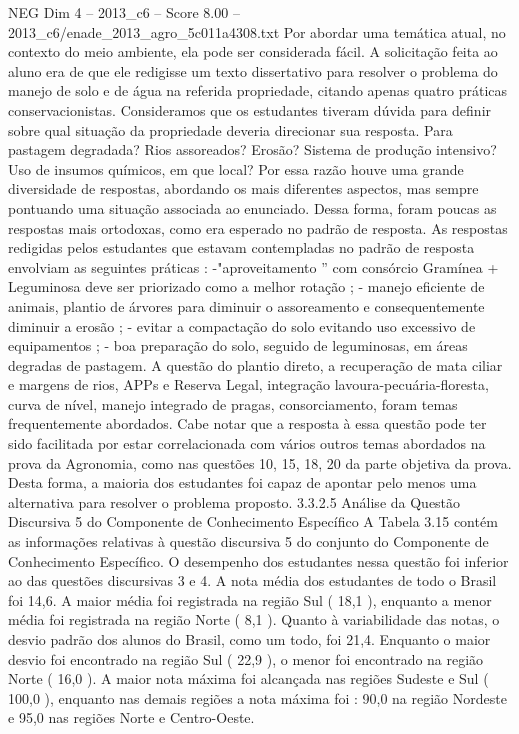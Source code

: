 \begin{textsample}{NEG Dim 4 – 2013\_c6 – Score 8.00 – 2013\_c6/enade\_2013\_agro\_5c011a4308.txt}
Por abordar uma temática atual, no contexto do meio ambiente, ela pode ser considerada fácil.
A solicitação feita ao aluno era de que ele redigisse um texto dissertativo para resolver o problema do manejo de solo e de água na referida propriedade, citando apenas quatro práticas conservacionistas.
Consideramos que os estudantes tiveram dúvida para definir sobre qual situação da propriedade deveria direcionar sua resposta.
Para pastagem degradada?
Rios assoreados?
Erosão?
Sistema de produção intensivo?
Uso de insumos químicos, em que local?
Por essa razão houve uma grande diversidade de respostas, abordando os mais diferentes aspectos, mas sempre pontuando uma situação associada ao enunciado.
Dessa forma, foram poucas as respostas mais ortodoxas, como era esperado no padrão de resposta.
As respostas redigidas pelos estudantes que estavam contempladas no padrão de resposta envolviam as seguintes práticas : -"aproveitamento ” com consórcio Gramínea + Leguminosa deve ser priorizado como a melhor rotação ; - manejo eficiente de animais, plantio de árvores para diminuir o assoreamento e consequentemente diminuir a erosão ; - evitar a compactação do solo evitando uso excessivo de equipamentos ; - boa preparação do solo, seguido de leguminosas, em áreas degradas de pastagem.
A questão do plantio direto, a recuperação de mata ciliar e margens de rios, APPs e Reserva Legal, integração lavoura-pecuária-floresta, curva de nível, manejo integrado de pragas, consorciamento, foram temas frequentemente abordados.
Cabe notar que a resposta à essa questão pode ter sido facilitada por estar correlacionada com vários outros temas abordados na prova da Agronomia, como nas questões 10, 15, 18, 20 da parte objetiva da prova.
Desta forma, a maioria dos estudantes foi capaz de apontar pelo menos uma alternativa para resolver o problema proposto. 3.3.2.5 Análise da Questão Discursiva 5 do Componente de Conhecimento Específico A Tabela 3.15 contém as informações relativas à questão discursiva 5 do conjunto do Componente de Conhecimento Específico.
O desempenho dos estudantes nessa questão foi inferior ao das questões discursivas 3 e 4.
A nota média dos estudantes de todo o Brasil foi 14,6.
A maior média foi registrada na região Sul ( 18,1 ), enquanto a menor média foi registrada na região Norte ( 8,1 ).
Quanto à variabilidade das notas, o desvio padrão dos alunos do Brasil, como um todo, foi 21,4.
Enquanto o maior desvio foi encontrado na região Sul ( 22,9 ), o menor foi encontrado na região Norte ( 16,0 ).
A maior nota máxima foi alcançada nas regiões Sudeste e Sul ( 100,0 ), enquanto nas demais regiões a nota máxima foi : 90,0 na região Nordeste e 95,0 nas regiões Norte e Centro-Oeste.

\end{textsample}
